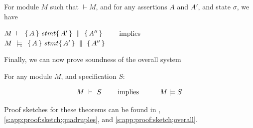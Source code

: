 \begin{theorem}
\label{t:quadruple:sound}
For module  $M$ %
such that  $\vdash M$, and for any assertions $A$ and $A'$, and state  $\sigma$, we have

\begin{center}
$M\ \vdash\   \{\, A \, \}\ stmt \{\, A' \, \} \, \,\parallel\,\, \{\, A'' \, \} $ \ \ \ \ implies \ \ \ \ $M\ \modelsD\  \quadruple {A} {stmt} {A'} {A''}$
\end{center}

\end{theorem}

\label{sect:prove:triples:overall}
Finally, we can now prove soundness of the overall system

\begin{theorem}[Soundness]
\label{thm:soundness}
 For any module $M$, and specification $S$:
 
 $$\proves{M}{S}\ \ \ \ \ \ \ \mbox{implies}\ \ \ \ \ \  \ \ \ \satisfies{M}{S}$$
\end{theorem}

Proof sketches for these theorems can be found in \A, \ref{s:app:proof:sketch;quadruples}, and \ref{s:app:proof:sketch;overall}. 

%
